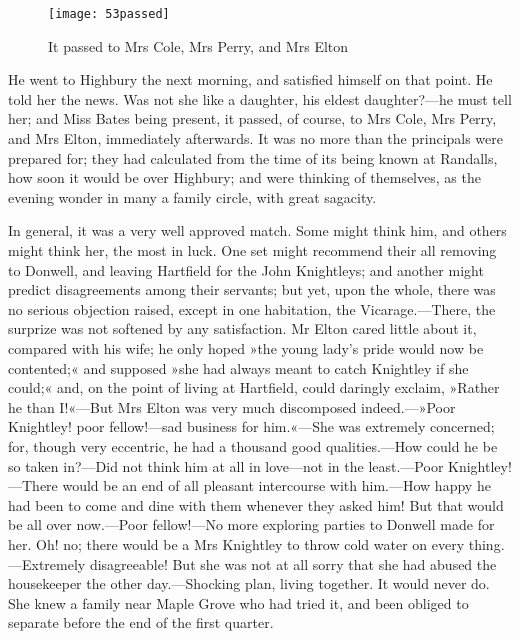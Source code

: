 \begin{figure}[tbph]
\centering
\texttt{[image: 53passed]}
\caption{It passed to Mrs Cole, Mrs Perry, and Mrs Elton}
\end{figure}

He went to Highbury the next morning, and satisfied himself on that point. He told her the news. Was not she like a daughter, his eldest daughter?—he must tell her; and Miss Bates being present, it passed, of course, to Mrs Cole, Mrs Perry, and Mrs Elton, immediately afterwards. It was no more than the principals were prepared for; they had calculated from the time of its being known at Randalls, how soon it would be over Highbury; and were thinking of themselves, as the evening wonder in many a family circle, with great sagacity.

In general, it was a very well approved match. Some might think him, and others might think her, the most in luck. One set might recommend their all removing to Donwell, and leaving Hartfield for the John Knightleys; and another might predict disagreements among their servants; but yet, upon the whole, there was no serious objection raised, except in one habitation, the Vicarage.—There, the surprize was not softened by any satisfaction. Mr Elton cared little about it, compared with his wife; he only hoped »the young lady's pride would now be contented;« and supposed »she had always meant to catch Knightley if she could;« and, on the point of living at Hartfield, could daringly exclaim, »Rather he than I!«—But Mrs Elton was very much discomposed indeed.—»Poor Knightley! poor fellow!—sad business for him.«—She was extremely concerned; for, though very eccentric, he had a thousand good qualities.—How could he be so taken in?—Did not think him at all in love—not in the least.—Poor Knightley!—There would be an end of all pleasant intercourse with him.—How happy he had been to come and dine with them whenever they asked him! But that would be all over now.—Poor fellow!—No more exploring parties to Donwell made for her. Oh! no; there would be a Mrs Knightley to throw cold water on every thing.—Extremely disagreeable! But she was not at all sorry that she had abused the housekeeper the other day.—Shocking plan, living together. It would never do. She knew a family near Maple Grove who had tried it, and been obliged to separate before the end of the first quarter.